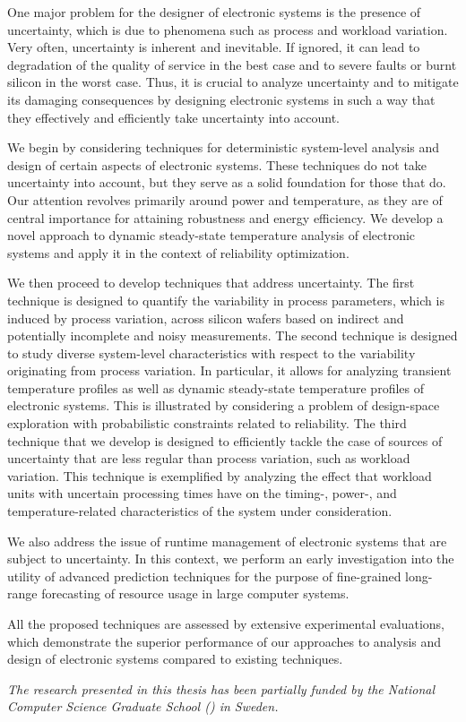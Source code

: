 One major problem for the designer of electronic systems is the presence of
uncertainty, which is due to phenomena such as process and workload variation.
Very often, uncertainty is inherent and inevitable. If ignored, it can lead to
degradation of the quality of service in the best case and to severe faults or
burnt silicon in the worst case. Thus, it is crucial to analyze uncertainty and
to mitigate its damaging consequences by designing electronic systems in such a
way that they effectively and efficiently take uncertainty into account.

We begin by considering techniques for deterministic system-level analysis and
design of certain aspects of electronic systems. These techniques do not take
uncertainty into account, but they serve as a solid foundation for those that
do. Our attention revolves primarily around power and temperature, as they are
of central importance for attaining robustness and energy efficiency. We develop
a novel approach to dynamic steady-state temperature analysis of electronic
systems and apply it in the context of reliability optimization.

We then proceed to develop techniques that address uncertainty. The first
technique is designed to quantify the variability in process parameters, which
is induced by process variation, across silicon wafers based on indirect and
potentially incomplete and noisy measurements. The second technique is designed
to study diverse system-level characteristics with respect to the variability
originating from process variation. In particular, it allows for analyzing
transient temperature profiles as well as dynamic steady-state temperature
profiles of electronic systems. This is illustrated by considering a problem of
design-space exploration with probabilistic constraints related to reliability.
The third technique that we develop is designed to efficiently tackle the case
of sources of uncertainty that are less regular than process variation, such as
workload variation. This technique is exemplified by analyzing the effect that
workload units with uncertain processing times have on the timing-, power-, and
temperature-related characteristics of the system under consideration.

We also address the issue of runtime management of electronic systems that are
subject to uncertainty. In this context, we perform an early investigation into
the utility of advanced prediction techniques for the purpose of fine-grained
long-range forecasting of resource usage in large computer systems.

All the proposed techniques are assessed by extensive experimental evaluations,
which demonstrate the superior performance of our approaches to analysis and
design of electronic systems compared to existing techniques.

\vspace{1em}
\noindent
\emph{
  The research presented in this thesis has been partially funded by the
  National Computer Science Graduate School () in Sweden.
}
